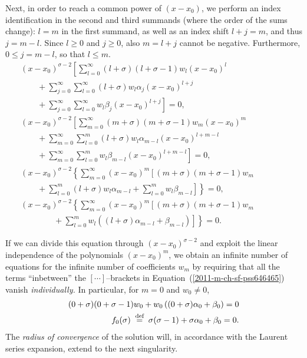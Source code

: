Next, in order  to reach a  common power of $(x-x_0)$,
we perform an index identification  in the second and third summands (where the order of the sums change):
$l=m$ in the first summand, as well as an index shift
$
l+j =m
$, and thus
$j= m-l$.
Since
$l\ge 0$  and  $j\ge 0$, also $m=l+j$ cannot be negative.
Furthermore,
$0\le j = m-l$, so that  $l\le m$.
\begin{equation}
\begin{split}
(x-x_0)^{\sigma-2} \left[  \sum_{l=0}^\infty
({l + \sigma})({l + \sigma-1})   w_l (x-x_0)^{l} \right.    \qquad \qquad
\\
\qquad + \sum_{j=0}^\infty  \sum_{l=0}^\infty ({l + \sigma})   w_l    \alpha_j (x-x_0)^{l+j}  \qquad \qquad
\\
\left.
\qquad + \sum_{j=0}^\infty  \sum_{l=0}^\infty  w_l  \beta_j (x-x_0)^{l+j}  \right]
    =   0,\\
(x-x_0)^{\sigma-2} \left[   \sum_{m=0}^\infty
({m + \sigma})({m + \sigma-1})   w_m (x-x_0)^{m} \right. \qquad \qquad \\
\qquad + \sum_{m=0}^\infty  \sum_{l=0}^m ({l + \sigma})   w_l    \alpha_{m-l} (x-x_0)^{l+m-l}  \qquad \qquad
\\
\left.
\qquad + \sum_{m=0}^\infty  \sum_{l=0}^m  w_l  \beta_{m-l} (x-x_0)^{l+m-l}     \right]
    =   0,\\
(x-x_0)^{\sigma-2}\left\{     \sum_{m=0}^\infty
(x-x_0)^{m} \left[
({m + \sigma})({m + \sigma-1})   w_m \right.\right. \qquad \qquad \\
   \left.  \left.  \qquad + \sum_{l=0}^m  ({l + \sigma})   w_l   \alpha_{m-l}
 +  \sum_{l=0}^m  w_l \beta_{m-l}
\right]
\right\}
    =   0,    \\
(x-x_0)^{\sigma-2}\left\{     \sum_{m=0}^\infty
(x-x_0)^{m} \left[
({m + \sigma})({m + \sigma-1})   w_m
\right.
\right.   \qquad \qquad
 \\
\qquad \qquad +
\left.
\left.
 \sum_{l=0}^m w_l  \left( ({l + \sigma}) \alpha_{m-l}
 + \beta_{m-l}
\right)
\right]
\right\}
    =   0.
\end{split}
\label{2011-m-ch-sf-pss646465}
\end{equation}

If we can divide this equation through  $(x-x_0)^{\sigma-2}$
and exploit the linear independence of the polynomials $(x-x_0)^{m}$,
we obtain an infinite number of equations for the infinite number of coefficients $w_m$
by requiring that all the terms ``inbetween'' the $[\cdots ]$--brackets in Equation~(\ref{2011-m-ch-sf-pss646465})
vanish {\em individually.}
In particular, for $m=0$ and $w_0\neq 0$,
\begin{equation}
\begin{split}
({0+ \sigma})({0 + \sigma-1})   w_0
+
 w_0  \left( ({0 + \sigma}) \alpha_{0} + \beta_{0}\right)
    =   0\\
 f_0(\sigma ) \stackrel{{\tiny \textrm{ def }}}{=} \sigma({\sigma-1}) +  \sigma \alpha_{0} + \beta_{0}           =   0
.
\end{split}
\label{2011-m-ch-sf-pss2sigma}
\end{equation}
The {\em radius of convergence} of the solution will,
in accordance with the Laurent series expansion, extend to the next singularity.


